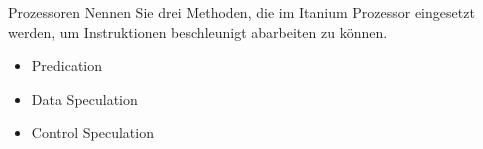 \begin{aufgabe}{Prozessoren}
    Nennen Sie drei Methoden,
    die im Itanium Prozessor eingesetzt werden,
    um Instruktionen beschleunigt abarbeiten zu können.
    \tcblower
    \begin{itemize}
        \item Predication
        \item Data Speculation
        \item Control Speculation
    \end{itemize}
\end{aufgabe}